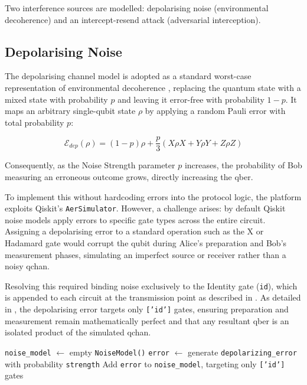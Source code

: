 \documentclass[11pt, a4paper]{report}
\begin{document}
Two interference sources are modelled: depolarising noise (environmental decoherence) and an intercept-resend attack (adversarial interception).

\subsection{Depolarising Noise}
\label{subsec:noise}

The depolarising channel model is adopted as a standard worst-case representation of environmental decoherence \cite{QKDbible}, replacing the quantum state with a mixed state with probability $p$ and leaving it error-free with probability $1-p$. It maps an arbitrary single-\gls{qubit} state $\rho$ by applying a random Pauli error with total probability $p$:

\begin{equation}
\label{eq:depolarising}
\mathcal{E}_{dep}(\rho) = (1-p)\rho + \frac{p}{3}(X\rho X + Y\rho Y + Z\rho Z)
\end{equation}

Consequently, as the Noise Strength parameter $p$ increases, the probability of Bob measuring an erroneous outcome grows, directly increasing the \gls{qber}.

To implement this without hardcoding errors into the protocol logic, the platform exploits Qiskit's \texttt{AerSimulator}. However, a challenge arises: by default Qiskit noise models apply errors to specific gate types across the entire circuit. Assigning a depolarising error to a standard operation such as the X or Hadamard gate would corrupt the \gls{qubit} during Alice's preparation and Bob's measurement phases, simulating an imperfect source or receiver rather than a noisy \gls{qchan}.

Resolving this required binding noise exclusively to the Identity gate (\texttt{id}), which is appended to each circuit at the transmission point as described in . As detailed in , the depolarising error targets only \texttt{['id']} gates, ensuring preparation and measurement remain mathematically perfect and that any resultant \gls{qber} is an isolated product of the simulated \gls{qchan}.

\begin{algorithm}[htbp]
    \caption{AerSimulator Backend Generation for Channel Noise.}\label{alg:noise_model}
    \texttt{noise\_model} $\leftarrow$ empty \texttt{NoiseModel()}\;
    \texttt{error} $\leftarrow$ generate \texttt{depolarizing\_error} with probability \texttt{strength}\; 
    Add \texttt{error} to \texttt{noise\_model}, targeting only \texttt{['id']} gates\; 
\end{algorithm}
\end{document}
